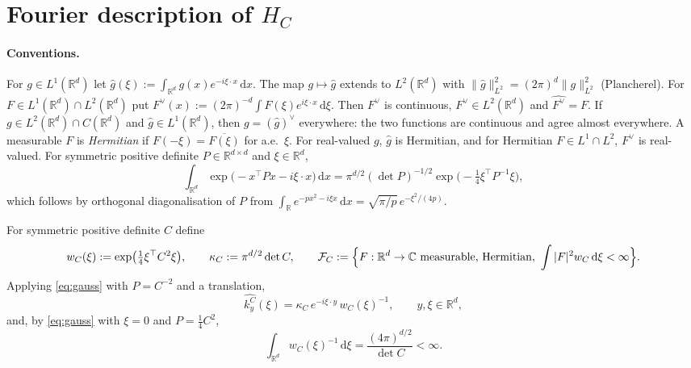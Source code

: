 \documentclass[11pt]{article}
\theoremstyle{definition}
\theoremstyle{remark}
\newcommand{\R}{\mathbb{R}}
\newcommand{\dd}{\,\mathrm{d}}
\newcommand{\FC}[1]{\mathcal{F}_{#1}}
\newcommand{\hatf}[1]{\widehat{#1}}
\newcommand{\tp}{\top}
\begin{document}
\section{Fourier description of \texorpdfstring{$H_C$}{H\_C}}\label{sec:fourier}

\paragraph{Conventions.}
For $g\in L^1(\R^d)$ let $\hatf g(\xi):=\int_{\R^d}g(x)e^{-i\xi\cdot x}\dd x$. The map $g\mapsto\hatf g$ extends to $L^2(\R^d)$
with $\|\hatf g\|_{L^2}^2=(2\pi)^d\|g\|_{L^2}^2$ (Plancherel). For $F\in L^1(\R^d)\cap L^2(\R^d)$ put
$F^\vee(x):=(2\pi)^{-d}\int F(\xi)e^{i\xi\cdot x}\dd\xi$. Then $F^\vee$ is continuous, $F^\vee\in L^2(\R^d)$ and
$\hatf{F^\vee}=F$. If $g\in L^2(\R^d)\cap C(\R^d)$ and $\hatf g\in L^1(\R^d)$, then $g=(\hatf g)^\vee$ everywhere:
the two functions are continuous and agree almost everywhere. A measurable $F$ is \emph{Hermitian} if
$F(-\xi)=\overline{F(\xi)}$ for a.e.\ $\xi$. For real-valued $g$, $\hatf g$ is Hermitian, and for Hermitian
$F\in L^1\cap L^2$, $F^\vee$ is real-valued. For symmetric positive definite $P\in\R^{d\times d}$ and
$\xi\in\R^d$,
\begin{equation}\label{eq:gauss}
\int_{\R^d}\exp\bigl(-x^\tp Px-i\xi\cdot x\bigr)\dd x=\pi^{d/2}(\det P)^{-1/2}\exp\bigl(-\tfrac14\xi^\tp P^{-1}\xi\bigr),
\end{equation}
which follows by orthogonal diagonalisation of $P$ from $\int_\R e^{-px^2-i\xi x}\dd x=\sqrt{\pi/p}\,e^{-\xi^2/(4p)}$.

For symmetric positive definite $C$ define
\begin{equation}\label{eq:wC}
w_C(\xi):=\exp\bigl(\tfrac14\xi^\tp C^2\xi\bigr),\qquad \kappa_C:=\pi^{d/2}\det C,\qquad
\FC{C}:=\Bigl\{F:\R^d\to\mathbb C\ \text{measurable, Hermitian},\ \int|F|^2w_C\dd\xi<\infty\Bigr\}.
\end{equation}
Applying \eqref{eq:gauss} with $P=C^{-2}$ and a translation,
\begin{equation}\label{eq:kernelFT}
\hatf{k^C_y}(\xi)=\kappa_C\,e^{-i\xi\cdot y}\,w_C(\xi)^{-1},\qquad y,\xi\in\R^d ,
\end{equation}
and, by \eqref{eq:gauss} with $\xi=0$ and $P=\frac14C^2$,
\begin{equation}\label{eq:intw}
\int_{\R^d}w_C(\xi)^{-1}\dd\xi=\frac{(4\pi)^{d/2}}{\det C}<\infty .
\end{equation}
\end{document}
